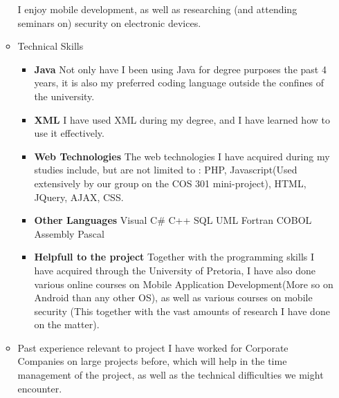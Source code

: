 \documentclass[12pt, oneside]{article}
\begin{document}
\begin{enumerate}
\begin{itemize}
				I enjoy mobile development, as well as researching (and attending seminars on) security on electronic devices.
			\item Technical Skills\newline\newline
				\begin{itemize}
				\item {\bf Java}\newline
					Not only have I been using Java for degree purposes the past 4 years, it is also my preferred coding language
					outside the confines of the university.
				\item {\bf XML}\newline
					I have used XML during my degree, and I have learned how to use it effectively.
				\item {\bf Web Technologies}\newline
					The web technologies I have acquired during my studies include, but are not limited to :
					PHP, Javascript(Used extensively by our group on the COS 301 mini-project), HTML, JQuery, AJAX, CSS.
				\item {\bf Other Languages}\newline
					Visual C\#\newline
					C++\newline
					SQL\newline
					UML\newline	
					Fortran\newline
					COBOL\newline
					Assembly\newline
					Pascal\newline
				\item {\bf Helpfull to the project}\newline
					Together with the programming skills I have acquired through the University of Pretoria, I have also done various online
					courses on Mobile Application Development(More so on Android than any other OS), as well as various courses on mobile security
					(This together with the vast amounts of research I have done on the matter).
				\end{itemize}
			\item Past experience relevant to project\newline\newline
				I have worked for Corporate Companies on large projects before, which will help in the time management of the project,
				as well as the technical difficulties we might encounter.
				

\end{itemize}
\end{enumerate}
\end{document}
